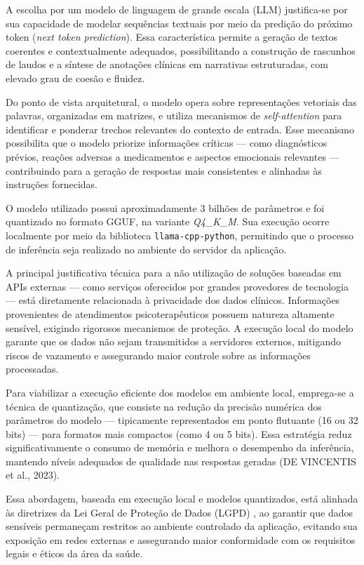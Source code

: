 A escolha por um modelo de linguagem de grande escala (LLM) justifica-se por sua capacidade de modelar sequências textuais por meio da predição do próximo token (\textit{next token prediction}). Essa característica permite a geração de textos coerentes e contextualmente adequados, possibilitando a construção de rascunhos de laudos e a síntese de anotações clínicas em narrativas estruturadas, com elevado grau de coesão e fluidez.

Do ponto de vista arquitetural, o modelo opera sobre representações vetoriais das palavras, organizadas em matrizes, e utiliza mecanismos de \textit{self-attention} para identificar e ponderar trechos relevantes do contexto de entrada. Esse mecanismo possibilita que o modelo priorize informações críticas — como diagnósticos prévios, reações adversas a medicamentos e aspectos emocionais relevantes — contribuindo para a geração de respostas mais consistentes e alinhadas às instruções fornecidas.

O modelo utilizado possui aproximadamente 3 bilhões de parâmetros e foi quantizado no formato GGUF, na variante \textit{Q4\_K\_M}. Sua execução ocorre localmente por meio da biblioteca \texttt{llama-cpp-python}, permitindo que o processo de inferência seja realizado no ambiente do servidor da aplicação.

A principal justificativa técnica para a não utilização de soluções baseadas em APIs externas — como serviços oferecidos por grandes provedores de tecnologia — está diretamente relacionada à privacidade dos dados clínicos. Informações provenientes de atendimentos psicoterapêuticos possuem natureza altamente sensível, exigindo rigorosos mecanismos de proteção. A execução local do modelo garante que os dados não sejam transmitidos a servidores externos, mitigando riscos de vazamento e assegurando maior controle sobre as informações processadas.

Para viabilizar a execução eficiente dos modelos em ambiente local, emprega-se a técnica de quantização, que consiste na redução da precisão numérica dos parâmetros do modelo — tipicamente representados em ponto flutuante (16 ou 32 bits) — para formatos mais compactos (como 4 ou 5 bits). Essa estratégia reduz significativamente o consumo de memória e melhora o desempenho da inferência, mantendo níveis adequados de qualidade nas respostas geradas (DE VINCENTIS et al., 2023).

Essa abordagem, baseada em execução local e modelos quantizados, está alinhada às diretrizes da Lei Geral de Proteção de Dados (LGPD) \cite{brasil2018lei}, ao garantir que dados sensíveis permaneçam restritos ao ambiente controlado da aplicação, evitando sua exposição em redes externas e assegurando maior conformidade com os requisitos legais e éticos da área da saúde.
\fi

